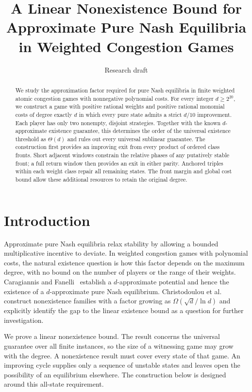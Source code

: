 \documentclass[11pt]{article}
\title{A Linear Nonexistence Bound for Approximate Pure Nash Equilibria\\in Weighted Congestion Games}
\author{}
\date{Research draft}
\theoremstyle{definition}
\theoremstyle{remark}
\begin{document}
\maketitle
\begin{abstract}
We study the approximation factor required for pure Nash equilibria in finite weighted atomic congestion games with nonnegative polynomial costs. For every integer $d\ge 2^{20}$, we construct a game with positive rational weights and positive rational monomial costs of degree exactly $d$ in which every pure state admits a strict $d/10$ improvement. Each player has only two nonempty, disjoint strategies. Together with the known $d$-approximate existence guarantee, this determines the order of the universal existence threshold as $\Theta(d)$ and rules out every universal sublinear guarantee. The construction first provides an improving exit from every product of ordered class fronts. Short adjacent windows constrain the relative phases of any putatively stable front; a full return window then provides an exit in either parity. Anchored triples within each weight class repair all remaining states. The front margin and global cost bound allow these additional resources to retain the original degree.
\end{abstract}

\section{Introduction}
Approximate pure Nash equilibria relax stability by allowing a bounded multiplicative incentive to deviate. In weighted congestion games with polynomial costs, the natural existence question is how this factor depends on the maximum degree, with no bound on the number of players or the range of their weights. Caragiannis and Fanelli~\cite{CF2021} establish a $d$-approximate potential and hence the existence of a $d$-approximate pure Nash equilibrium. Christodoulou et al.~\cite{CGGPW2023} construct nonexistence families with a factor growing as $\Omega(\sqrt d/\ln d)$ and explicitly identify the gap to the linear existence bound as a question for further investigation.

We prove a linear nonexistence bound. The result concerns the universal guarantee over all finite instances, so the size of a witnessing game may grow with the degree. A nonexistence result must cover every state of that game. An improving cycle supplies only a sequence of unstable states and leaves open the possibility of an equilibrium elsewhere. The construction below is designed around this all-state requirement.
\end{document}
